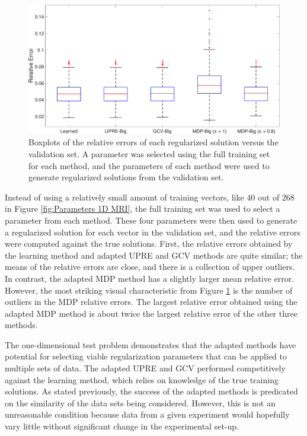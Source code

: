 \documentclass[12pt]{article}
\begin{document}
\begin{figure}[ht]
\includegraphics[scale=0.36]{Figures/Errors1D_mri}
\caption{Boxplots of the relative errors of each regularized solution versus the validation set. A parameter was selected using the full training set for each method, and the parameters of each method were used to generate regularized solutions from the validation set.}
\label{fig:Errors 1D MRI}
\end{figure}

\noindent Instead of using a relatively small amount of training vectors, like 40 out of 268 in Figure \ref{fig:Parameters 1D MRI}, the full training set was used to select a parameter from each method. These four parameters were then used to generate a regularized solution for each vector in the validation set, and the relative errors were computed against the true solutions. First, the relative errors obtained by the learning method and adapted UPRE and GCV methods are quite similar; the means of the relative errors are close, and there is a collection of upper outliers. In contrast, the adapted MDP method has a slightly larger mean relative error. However, the most striking visual characteristic from Figure \ref{fig:Errors 1D MRI} is the number of outliers in the MDP relative errors. The largest relative error obtained using the adapted MDP method is about twice the largest relative error of the other three methods. \par 
The one-dimensional test problem demonstrates that the adapted methods have potential for selecting viable regularization parameters that can be applied to multiple sets of data. The adapted UPRE and GCV performed competitively against the learning method, which relies on knowledge of the true training solutions. As stated previously, the success of the adapted methods is predicated on the similarity of the data sets being considered. However, this is not an unreasonable condition because data from a given experiment would hopefully vary little without significant change in the experimental set-up.
\end{document}
